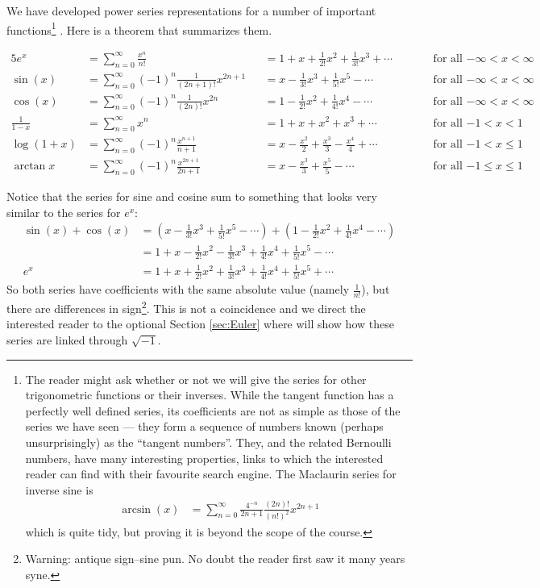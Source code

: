 We have developed power series representations for a number of important
functions\footnote{The reader might ask whether or not we will give
the series for other trigonometric functions or their inverses. While
the tangent function has a perfectly well defined series, its
coefficients are not as simple as those of the series we have
seen --- they form a sequence of numbers known (perhaps unsurprisingly)
as the ``tangent numbers''. They, and the related Bernoulli numbers,
have many interesting properties, links to which the interested reader
can find with their favourite search engine. The Maclaurin series for
inverse sine is
\begin{align*}
  \arcsin(x) &= \sum_{n=0}^\infty \frac{4^{-n}}{2n+1}\frac{(2n)!}{(n!)^2} x^{2n+1}
\end{align*}
which is quite tidy, but proving it is beyond the scope of the course.
}
. Here is a theorem that summarizes
them.
\begin{theorem}\label{thm:SRimportantTaylorSeries}
\begin{alignat*}{5}
e^x &= \sum_{n=0}^\infty\frac{x^n}{n!}
    &&= 1 +x + \frac{1}{2!} x^2 +\frac{1}{3!} x^3+\cdots
    &&\qquad\text{for all $-\infty<x<\infty$} \\
\sin(x) &= \sum_{n=0}^\infty(-1)^n\frac{1}{(2n+1)!}x^{2n+1}
    &&= x-\frac{1}{3!}x^3+\frac{1}{5!}x^5-\cdots
    &&\qquad\text{for all $-\infty<x<\infty$} \\
\cos(x) &= \sum_{n=0}^\infty(-1)^n\frac{1}{(2n)!}x^{2n}
    &&= 1-\frac{1}{2!}x^2+\frac{1}{4!}x^4-\cdots
    &&\qquad\text{for all $-\infty<x<\infty$} \\
\frac{1}{1-x} &= \sum_{n=0}^\infty x^n
    &&= 1 + x+ x^2 + x^3 + \cdots
    &&\qquad\text{for all $-1<x<1$} \\
\log(1+x) &= \sum_{n=0}^\infty (-1)^n\frac{x^{n+1}}{n+1}
     &&= x-\frac{x^2}{2}+\frac{x^3}{3}-\frac{x^4}{4}+\cdots
    &&\qquad\text{for all $-1<x\le 1$} \\
\arctan x &=  \sum_{n=0}^\infty (-1)^n\frac{x^{2n+1}}{2n+1}
    &&= x -\frac{x^3}{3} +\frac{x^5}{5}-\cdots
    &&\qquad\text{for all $-1\le x\le 1$}
\end{alignat*}
\end{theorem}
Notice that the series for sine and cosine sum to something that looks very similar to the series for $e^x$:
\begin{align*}
  \sin(x)+\cos(x) &= \left(x-\frac{1}{3!}x^3+\frac{1}{5!}x^5-\cdots\right)
  +\left(1-\frac{1}{2!}x^2+\frac{1}{4!}x^4-\cdots\right)\\
  &= 1 + x - \frac{1}{2!}x^2 - \frac{1}{3!}x^3 + \frac{1}{4!}x^4 + \frac{1}{5!}x^5 - \cdots\\
  e^x
  &= 1 + x + \frac{1}{2!}x^2 + \frac{1}{3!}x^3 + \frac{1}{4!}x^4 + \frac{1}{5!}x^5 + \cdots
\end{align*}
So both series have coefficients with the same absolute value
(namely $\frac{1}{n!}$), but there are differences in
sign\footnote{Warning: antique sign--sine pun. No doubt the reader
first saw it many years syne.}.
This is not a coincidence and we direct the interested reader to the optional Section \ref{sec:Euler} where will show how these series are linked through $\sqrt{-1}$.


